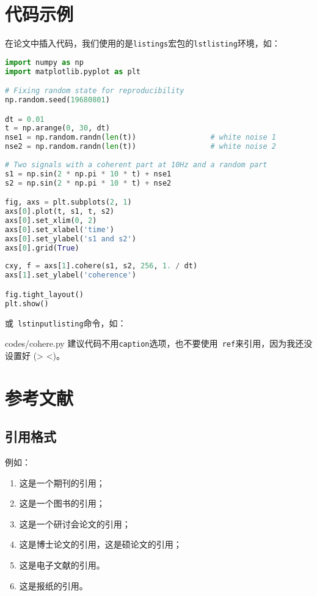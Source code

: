 \section{代码示例}

在论文中插入代码，我们使用的是\texttt{listings}宏包的\texttt{lstlisting}环境，如：
\begin{lstlisting}[language=Python,
    caption1=Python 画图代码1,
    caption2=Python ploting code 1]
import numpy as np
import matplotlib.pyplot as plt

# Fixing random state for reproducibility
np.random.seed(19680801)

dt = 0.01
t = np.arange(0, 30, dt)
nse1 = np.random.randn(len(t))                 # white noise 1
nse2 = np.random.randn(len(t))                 # white noise 2
    
# Two signals with a coherent part at 10Hz and a random part
s1 = np.sin(2 * np.pi * 10 * t) + nse1
s2 = np.sin(2 * np.pi * 10 * t) + nse2

fig, axs = plt.subplots(2, 1)
axs[0].plot(t, s1, t, s2)
axs[0].set_xlim(0, 2)
axs[0].set_xlabel('time')
axs[0].set_ylabel('s1 and s2')
axs[0].grid(True)
 
cxy, f = axs[1].cohere(s1, s2, 256, 1. / dt)
axs[1].set_ylabel('coherence')

fig.tight_layout()
plt.show()
\end{lstlisting}
或\texttt{ lstinputlisting}命令，如：

{codes/cohere.py}
建议代码不用\texttt{caption}选项，也不要使用\texttt{ ref}来引用，因为我还没设置好 (> <)。

\section{参考文献}\label{sec:bibstyle}

\subsection{引用格式}

例如：
\begin{enumerate}
    \item 这是一个期刊的引用\cite{LIGOScientific:2017zic,ZhaoWen:2017twxjz}；
    \item 这是一个图书的引用\cite{Rubakov:2017xzr,Zhang:2021}；
    \item 这是一个研讨会论文的引用\cite{Tanikawa:2021+x}；
    \item 这是博士论文的引用\cite{Migenda:2019xbm,HuangGuoYuan:2020}，这是硕论文的引用\cite{Shojaeifar:2015csv,SongRen:2020}；
    \item 这是电子文献的引用\cite{Piro:2021oaa,bilibili:read}。
    \item 这是报纸的引用\cite{Li:2005}。
\end{enumerate}

